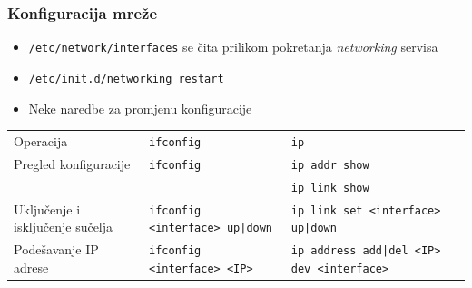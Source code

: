 \documentclass[t,table,usenames,dvipsnames]{beamer}
\begin{document}
\begin{frame}
	\frametitle{Konfiguracija mreže}
	\begin{itemize}
		\item \texttt{/etc/network/interfaces} se čita prilikom pokretanja \emph{networking} servisa
		\item[] \texttt{/etc/init.d/networking restart}
	\end{itemize}
	\begin{itemize}
		\item Neke naredbe za promjenu konfiguracije
	\end{itemize}
	\begin{table}[h]
		\begin{tabular}{p{4cm} p{3cm} p{3cm}}
			\rowcolor{BlueViolet!20}Operacija & \texttt{ifconfig} & \texttt{ip} \\
			Pregled konfiguracije & \texttt{ifconfig} & \texttt{ip addr show} \\ & & \texttt{ip link show} \\
			Uključenje i isključenje sučelja & \texttt{ifconfig <interface> up|down} & \texttt{ip link set <interface> up|down} \\
			Podešavanje IP adrese & \texttt{ifconfig <interface> <IP>} & \texttt{ip address add|del <IP> dev <interface>}
		\end{tabular}
	\end{table}
\end{frame}
\end{document}

